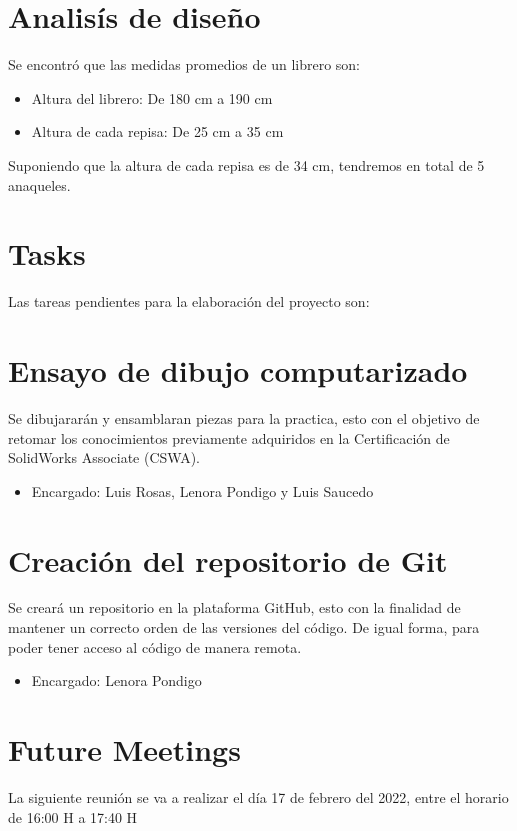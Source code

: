 \documentclass[12pt, a4paper]{article}
\begin{document}
\section{Analisís de diseño}
Se encontró que las medidas promedios de un librero son:

\begin{itemize}
    \item Altura del librero: De 180 cm a 190 cm
    \item Altura de cada repisa: De 25 cm a 35 cm
\end{itemize}

Suponiendo que la altura de cada repisa es de 34 cm, tendremos en total de 5 anaqueles.

\section*{Tasks}
Las tareas pendientes para la elaboración del proyecto son:
\setcounter{section}{0}

\section{Ensayo de dibujo computarizado} %

Se dibujararán y ensamblaran piezas para la practica, esto con el objetivo de retomar los conocimientos previamente adquiridos en la Certificación de SolidWorks Associate (CSWA).

\begin{itemize}
    \item Encargado: Luis Rosas, Lenora Pondigo y Luis Saucedo
\end{itemize}

\section{Creación del repositorio de Git} %

Se creará un repositorio en la plataforma GitHub, esto con la finalidad de mantener un correcto orden de las versiones del código. De igual forma, para poder tener acceso al código de manera remota.
\begin{itemize}
    \item Encargado: Lenora Pondigo
\end{itemize}

\section*{Future Meetings} %
La siguiente reuni\'on se va a realizar el d\'ia 17 de febrero del 2022, entre el horario de 16:00 H a 17:40 H
\end{document}
